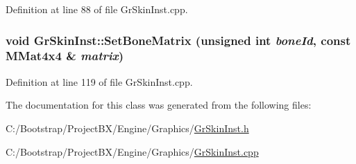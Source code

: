 Definition at line 88 of file GrSkinInst.cpp.\hypertarget{class_gr_skin_inst_c87444515796dea8b8e939cc43434655}{
\subsubsection[{SetBoneMatrix}]{\setlength{\rightskip}{0pt plus 5cm}void GrSkinInst::SetBoneMatrix (unsigned int {\em boneId}, \/  const {\bf MMat4x4} \& {\em matrix})}}
\label{class_gr_skin_inst_c87444515796dea8b8e939cc43434655}




Definition at line 119 of file GrSkinInst.cpp.

The documentation for this class was generated from the following files:\begin{CompactItemize}
\item 
C:/Bootstrap/ProjectBX/Engine/Graphics/\hyperlink{_gr_skin_inst_8h}{GrSkinInst.h}\item 
C:/Bootstrap/ProjectBX/Engine/Graphics/\hyperlink{_gr_skin_inst_8cpp}{GrSkinInst.cpp}\end{CompactItemize}
